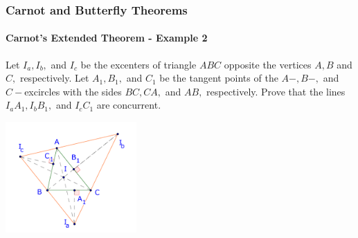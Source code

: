 \documentclass[8pt,xcolor=table,dvipsnames]{beamer}
\begin{document}
\begin{frame}[t]
    \frametitle{Carnot and Butterfly Theorems}
    \framesubtitle{Carnot's Extended Theorem - Example 2}
    \begin{example}
        Let $I_a, I_b,$ and $I_c$ be the excenters of triangle $ABC$ opposite the vertices $A, B$ and $C,$ respectively.
        Let $A_1, B_1,$ and $C_1$ be the tangent points of the $A-, B-,$ and $C-$excircles with the sides $BC, CA,$ and $AB,$ respectively.
        Prove that the lines $I_a A_1, I_b B_1,$ and $I_c C_1$ are concurrent.    
    \end{example}

    \bigbreak
    \begin{center}
        \includegraphics[width=5cm]{./svg/pdf/24-25-s7-g3-p2.pdf}
    \end{center}
\end{frame}
\end{document}
